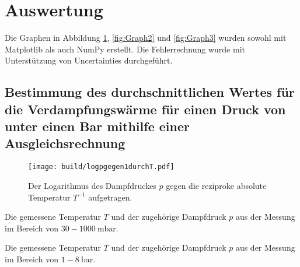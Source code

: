 \section{Auswertung}
\label{sec:Auswertung}
Die Graphen in Abbildung \ref{fig:Graph1}, \ref{fig:Graph2} und \ref{fig:Graph3} wurden sowohl mit Matplotlib \cite{matplotlib} als auch NumPy \cite{numpy} erstellt. Die Fehlerrechnung wurde mit Unterstützung von Uncertainties \cite{uncertainties} durchgeführt.
\subsection{Bestimmung des durchschnittlichen Wertes für die Verdampfungswärme für einen Druck von unter einen Bar mithilfe einer Ausgleichsrechnung}
\begin{figure}
	\centering
	\caption{Der Logarithmus des Dampfdruckes $p$ gegen die reziproke absolute Temperatur $T^{-1}$ aufgetragen.}
	\texttt{[image: build/logpgegen1durchT.pdf]}
	\label{fig:Graph1}
\end{figure}
\begin{center}
	\begin{table}
		\caption{Die gemessene Temperatur $T$ und der zugehörige Dampfdruck $p$ aus der Messung im Bereich von $30-\SI{1000}{\milli\bar}$.}
		\begin{minipage}[t]{0.24\textwidth}
			\centering
			
		\end{minipage}
		\begin{minipage}[t]{0.24\textwidth}
			\centering
			
		\end{minipage}
		\begin{minipage}[t]{0.24\textwidth}
			\centering
			
		\end{minipage}
		\begin{minipage}[t]{0.24\textwidth}
			\centering
			
		\end{minipage}
	\end{table}
	\begin{table}
		\caption{Die gemessene Temperatur $T$ und der zugehörige Dampfdruck $p$ aus der Messung im Bereich von $1-\SI{8}{\bar}$.}
		\begin{minipage}[t]{0.5\textwidth}
			\centering
			
		\end{minipage}
		\begin{minipage}[t]{0.5\textwidth}
			\centering
			
		\end{minipage}
	\end{table}
\end{center}

